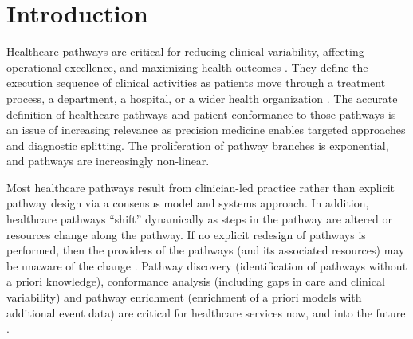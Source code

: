 \section{Introduction}
Healthcare pathways are critical for reducing clinical variability, affecting operational excellence, and maximizing health outcomes \cite{Lin2001}. They define the execution sequence of clinical activities as patients move through a treatment process, a department, a hospital, or a wider health organization %
\cite{Huang2016}. The accurate definition of healthcare pathways and patient conformance to those pathways is an issue of increasing relevance as precision medicine enables targeted approaches and diagnostic splitting. The proliferation of pathway branches is exponential, and pathways are increasingly non-linear. 

Most healthcare pathways result from clinician-led practice rather than explicit pathway design via a consensus model and systems approach. In addition, healthcare pathways “shift” dynamically as steps in the pathway are altered or resources change along the pathway. If no explicit redesign of pathways is performed, then the providers of the pathways (and its associated resources) may be unaware of the change \cite{Zhang2015}. Pathway discovery (identification of pathways without a priori knowledge), conformance analysis (including gaps in care and clinical variability) and pathway enrichment (enrichment of a priori models with additional event data) are critical for healthcare services now, and into the future \cite{Baker2017}.

